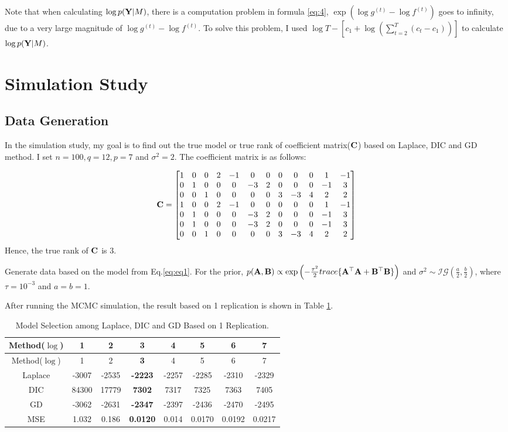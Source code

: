 \documentclass[]{book}
\begin{document}
Note that when calculating \(\log p({\bf Y}|M)\), there is a computation problem in formula \eqref{eq:4},
\(\exp (\log g^{(t)}-\log f^{(t)})\) goes to infinity, due to a very large magnitude of
\(\log g^{(t)}-\log f^{(t)}\). To solve this problem, I used
\(\log T - \left[c_1 + \log \left(\sum_{t=2}^{T} (c_t-c_{1})\right)\right]\) to calculate \(\log p({\bf Y}|M)\).

\hypertarget{simulation-study}{%
\section{Simulation Study}\label{simulation-study}}

\hypertarget{data-generation}{%
\subsection{Data Generation}\label{data-generation}}

In the simulation study, my goal is to find out the true model or true rank of coefficient matrix(\({\bf C}\)) based on Laplace, DIC and GD method. I set \(n=100,q=12,p=7\) and \(\sigma^2=2\). The coefficient matrix is as follows:

\[{\bf C}=\left[ \begin{array}{@{}*{12}{c}@{}}
1 & 0 & 0 & 2 & -1 & 0  & 0 & 0 & 0  & 0 & 1  & -1\\
0 & 1 & 0 & 0 & 0  & -3 & 2 & 0 & 0  & 0 & -1 & 3\\
0 & 0 & 1 & 0 & 0  & 0  & 0 & 3 & -3 & 4 & 2  & 2\\
1 & 0 & 0 & 2 & -1 & 0  & 0 & 0 & 0  & 0 & 1  & -1\\
0 & 1 & 0 & 0 & 0  & -3 & 2 & 0 & 0  & 0 & -1 & 3\\
0 & 1 & 0 & 0 & 0  & -3 & 2 & 0 & 0  & 0 & -1 & 3\\
0 & 0 & 1 & 0 & 0  & 0  & 0 & 3 &-3  &4  & 2  & 2
\end{array} \right]\]
Hence, the true rank of \({\bf C}\) is 3.

Generate data based on the model from Eq.\eqref{eq:eq1}. For the prior,
\(p({\bf A},{\bf B})\propto\exp\left(-\frac{\tau^2}{2} trace\{ {\bf A}^{{\top}}{\bf A}+{\bf B}^{{\top}}{\bf B}\}\right)\) and \(\sigma^2\sim \mathcal{IG}(\frac{a}{2},\frac{b}{2})\), where \(\tau=10^{-3}\) and \(a=b=1\).

After running the MCMC simulation, the result based on 1 replication is shown in Table \ref{tab:table1}.

\begin{longtable}[]{@{}cccccccc@{}}
\caption{\label{tab:table1} Model Selection among Laplace, DIC and GD Based on 1 Replication.}\tabularnewline
\toprule
Method(\(\log\)) & 1 & 2 & \textbf{3} & 4 & 5 & 6 & 7\tabularnewline
\midrule
\endfirsthead
\toprule
Method(\(\log\)) & 1 & 2 & \textbf{3} & 4 & 5 & 6 & 7\tabularnewline
\midrule
\endhead
Laplace & -3007 & -2535 & \textbf{-2223} & -2257 & -2285 & -2310 & -2329\tabularnewline
DIC & 84300 & 17779 & \textbf{7302} & 7317 & 7325 & 7363 & 7405\tabularnewline
GD & -3062 & -2631 & \textbf{-2347} & -2397 & -2436 & -2470 & -2495\tabularnewline
MSE & 1.032 & 0.186 & \textbf{0.0120} & 0.014 & 0.0170 & 0.0192 & 0.0217\tabularnewline
\bottomrule
\end{longtable}
\end{document}
